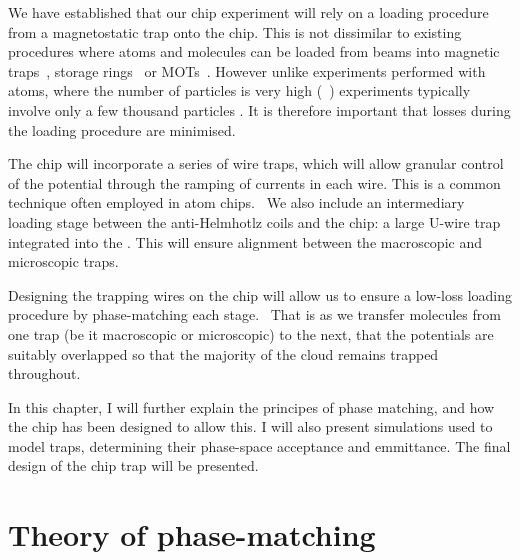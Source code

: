 We have established that our chip experiment will rely on a loading procedure
from a magnetostatic trap onto the chip. This is not dissimilar to existing
procedures where atoms and molecules can be loaded from beams into magnetic
traps~\cite{}, storage rings~\cite{} or MOTs~\cite{}. However unlike
experiments performed with atoms, where the number of particles is very high
(~\cite{}) \CaF experiments typically involve only a few thousand
particles \cite{}. It is therefore important that losses during the loading
procedure are minimised.

The chip will incorporate a series of wire traps, which will allow granular
control of the potential through the ramping of currents in each wire. This is
a common technique often employed in atom chips.~\cite{} We also include an
intermediary loading stage between the anti-Helmhotlz coils and the chip: a
large U-wire trap integrated into the . This will
ensure alignment between the macroscopic and microscopic traps.

Designing the trapping wires on the chip will allow us to ensure a low-loss
loading procedure by phase-matching each stage.~\cite{Crompvoets2005} That is
as we transfer molecules from one trap (be it macroscopic or microscopic) to
the next, that the potentials are suitably overlapped so that the majority of
the cloud remains trapped throughout.

In this chapter, I will further explain the principes of phase matching, and
how the chip has been designed to allow this. I will also present simulations
used to model traps, determining their phase-space acceptance and emmittance.
The final design of the chip trap will be presented.

\section{Theory of phase-matching}


